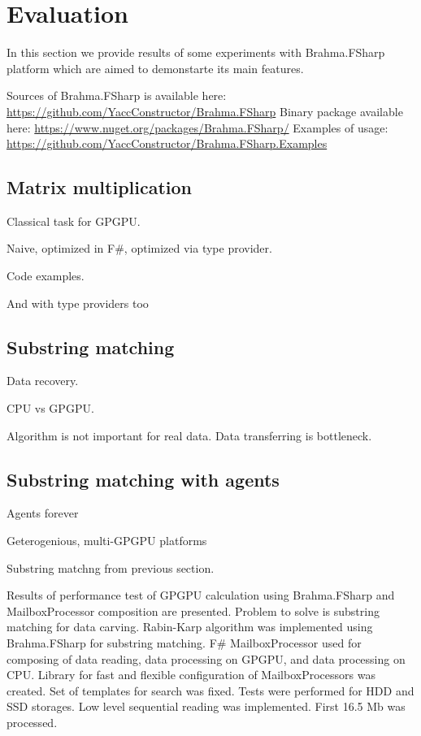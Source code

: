 \section{Evaluation}

In this section we provide results of some experiments with Brahma.FSharp platform which are aimed to demonstarte its main features.

Sources of Brahma.FSharp is available here: \url{https://github.com/YaccConstructor/Brahma.FSharp}
Binary package available here: \url{https://www.nuget.org/packages/Brahma.FSharp/}
Examples of usage: \url{https://github.com/YaccConstructor/Brahma.FSharp.Examples}

\subsection{Matrix multiplication}

Classical task for GPGPU.

Naive, optimized in F\#, optimized via type provider.

Code examples.

And with type providers too

\subsection{Substring matching}

Data recovery.

CPU vs GPGPU.

Algorithm is not important for real data. Data transferring is bottleneck.

\subsection{Substring matching with agents}

Agents forever~\cite{BrahmaStringMatching}~\cite{aleaGPUasync}

Geterogenious, multi-GPGPU platforms 

Substring matchng from previous section.

Results of performance test of GPGPU calculation using Brahma.FSharp and MailboxProcessor composition are presented.
Problem to solve is substring matching for data carving.
Rabin-Karp algorithm was implemented using Brahma.FSharp for substring matching.
F\# MailboxProcessor  used for composing of data reading, data processing on GPGPU, and data processing on CPU.
Library for fast and flexible configuration of MailboxProcessors was created.
Set of templates for search was fixed.
Tests were performed for HDD and SSD storages.
Low level sequential reading was implemented.
First 16.5 Mb was processed.

